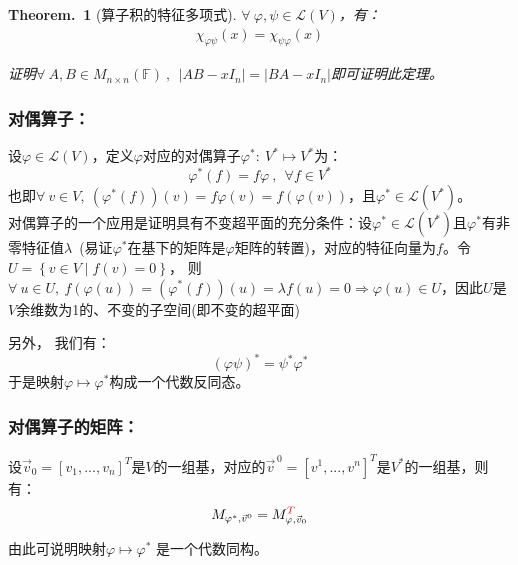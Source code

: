 \documentclass[zihao=5,UTF8]{report}
\theoremstyle{mystyle} %
\newtheorem{theorem}{Theorem.\,}
\begin{document}
\begin{theorem}[算子积的特征多项式]\label{算子积的特征多项式}
$\forall\ \varphi,\psi \in \mathscr{L}(V)$，有：
\begin{align*}
    \chi_{\varphi \psi}(x) =  \chi_{ \psi \varphi}(x)
\end{align*}
{\par\color{gray}\small
证明$\forall\ A,B\in M_{n\times n}(\mathbb{F})\ , \ \ \left | AB - xI_n \right | = \left | BA - xI_n \right |$即可证明此定理。
\par}

\end{theorem}

\subsubsection{对偶算子：}
设$\varphi \in \mathscr{L}(V)$，定义$\varphi$对应的对偶算子$\varphi^*:\ V^* \longmapsto V^*$为：
\begin{equation*}
    \varphi^*(f) = f\varphi\ ,\ \  \forall f \in V^*
\end{equation*}
也即$\forall\ v \in V,\ (\varphi^*(f))(v) =  f\varphi(v) = f(\varphi(v))$，且$\varphi^* \in \mathscr{L}(V^*)$。\\
{\color{gray}\small 对偶算子的一个应用是证明具有不变超平面的充分条件：设$\varphi^* \in \mathscr{L}(V^*)$且$\varphi^*$有非零特征值$\lambda$\ (易证$\varphi^*$在基下的矩阵是$\varphi$矩阵的转置)，对应的特征向量为$f$。令$U = \left\{v\in V\mid f(v) = 0 \right\}$，
则$\forall\ u \in U,\  f(\varphi(u)) = (\varphi^*(f))(u) = \lambda f(u) = 0 \Longrightarrow \varphi(u) \in U$，因此$U$是$V$余维数为1的、不变的子空间(即不变的超平面)}\par
另外， 我们有：
\begin{equation*}
    (\varphi\psi)^* = \psi^*\varphi^*
\end{equation*}
于是映射$\varphi \longmapsto \varphi^*$构成一个代数反同态。
\subsubsection{对偶算子的矩阵：}
设$\vec{v}_0 = [v_1,...,v_n]^T$是$V$的一组基，对应的$\vec{v}^{\,0} = [v^1,...,v^n]^T$是$V^*$的一组基，则有：
\begin{equation*}
    M_{\varphi^*,\vec{v}^{0}} = M_{\varphi, \vec{v}_0}^{\textcolor{red}{T}}
\end{equation*}
{\color{gray}\small 由此可说明映射$\varphi \longmapsto \varphi^*$ 是一个代数同构。\par
}
\end{document}
